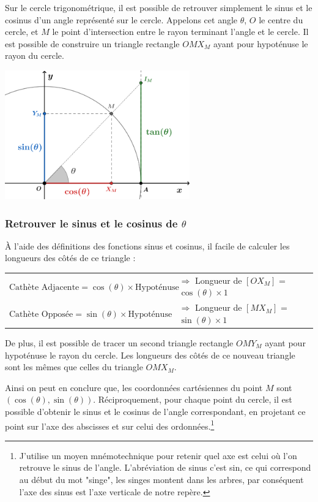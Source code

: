 \documentclass[a4paper]{article}
\begin{document}
			Sur le cercle trigonométrique, 
			il est possible de retrouver simplement le sinus et le cosinus d'un angle représenté sur le cercle. 
			Appelons cet angle $\theta$, $O$ le centre du cercle, et $M$ le point d'intersection entre le rayon terminant l'angle et le cercle.
			Il est possible de construire un triangle rectangle $OMX_M$ ayant pour hypoténuse le rayon du cercle.

			\begin{center}
				\includegraphics[width=8cm]{Image/Cercle Trigo/Cercle_trigo_lien_avec_fct_trigo.png}
			\end{center}

			\vspace{-0.5cm}
			
			\subsubsection{Retrouver le sinus et le cosinus de $\theta$}

			À l'aide des définitions des fonctions sinus et cosinus,
			il facile de calculer les longueurs des côtés de ce triangle :

			\begin{tabular}{ll}
				$\text{Cathète Adjacente} = \cos(\theta) \times \text{Hypoténuse}$ & $\Longrightarrow$ Longueur de $[OX_M]$ = $\cos(\theta) \times 1$\\
				$\text{Cathète Opposée} = \sin(\theta) \times \text{Hypoténuse}$   & $\Longrightarrow$ Longueur de $[MX_M]$ = $\sin(\theta) \times 1$\\
			\end{tabular}
			
			\medbreak

			De plus, il est possible de tracer un second triangle rectangle $OMY_M$ ayant pour hypoténuse le rayon du cercle.
			Les longueurs des côtés de ce nouveau triangle sont les mêmes que celles du triangle $OMX_M$.

			Ainsi on peut en conclure que,
			les coordonnées cartésiennes du point $M$ sont $(\cos(\theta), \sin(\theta))$.
			Réciproquement, pour chaque point du cercle,
			il est possible d'obtenir le sinus et le cosinus de l'angle correspondant,
			en projetant ce point sur l'axe des abscisses et sur celui des ordonnées.\footnote{
				J'utilise un moyen mnémotechnique pour retenir quel axe est celui où l'on retrouve le sinus de l'angle.
				L'abréviation de sinus c'est sin, ce qui correspond au début du mot "singe", 
				les singes montent dans les arbres, par conséquent l'axe des sinus est l'axe verticale de notre repère.
			}
\end{document}
